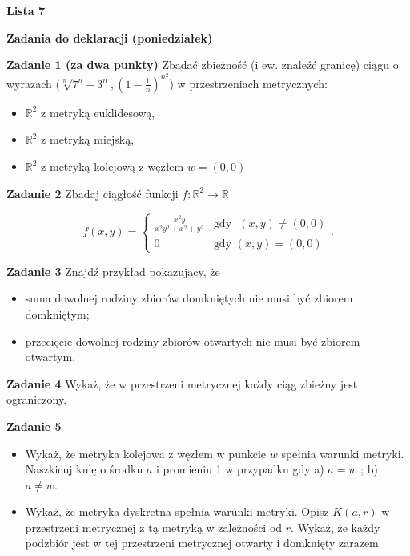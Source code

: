 \documentclass[a4paper,11pt]{article}
\begin{document}
\begin{center}
  {\large\textbf{Lista 7}}
\end{center}

\hrulefill
\begin{center}
    \textbf{Zadania do deklaracji (poniedziałek)}
\end{center}

\bigskip

\textbf{Zadanie 1 (za dwa punkty)} Zbadać zbieżność (i ew. znaleźć
granicę) ciągu o wyrazach $(\sqrt[n]{7^n-3^n}, (1-\tfrac{1}{n})^{n^2} $)
w przestrzeniach metrycznych:

\begin{itemize}
    \item $\mathbb{R}^2$ z metryką euklidesową,
    \item $\mathbb{R}^2$ z metryką miejską,
    \item $\mathbb{R}^2$ z metryką kolejową z węzłem  $w = (0,0)$
\end{itemize}

\bigskip

\textbf{Zadanie 2} Zbadaj ciągłość funkcji $f: \mathbb{R}^2 \to \mathbb{R}$

\[
f(x,y) = 
\begin{cases}
    \frac{x^2y}{x^2 y^2 + x^2 + y^2} & \text{gdy ~} (x,y) \neq (0,0)\\
    0 & \text{gdy~} (x,y) = (0,0)
\end{cases}
.\] 


\bigskip

\textbf{Zadanie 3} Znajdź przykład pokazujący, że 
\begin{itemize}
    \item  suma dowolnej rodziny zbiorów domkniętych nie musi być zbiorem
        domkniętym;
    \item przecięcie dowolnej rodziny zbiorów otwartych nie musi być
        zbiorem otwartym.
\end{itemize} 

\bigskip

\hrulefill

\bigskip

\textbf{Zadanie 4} Wykaż, że w przestrzeni metrycznej każdy ciąg zbieżny
jest ograniczony.

\bigskip

\textbf{Zadanie 5} 
\begin{itemize}
    \item Wykaż, że metryka kolejowa z węzłem w punkcie $w$ spełnia
        warunki metryki. Naszkicuj kulę o środku $a$ i promieniu 1 w
        przypadku gdy a) $a = w$ ; b) $a \neq w$.
    \item Wykaż, że metryka dyskretna spełnia warunki metryki. Opisz $K(a,
        r)$ w przestrzeni metrycznej z tą metryką w zależności od $r$.
        Wykaż, że każdy podzbiór jest w tej przestrzeni metrycznej
        otwarty i domknięty zarazem
\end{itemize}
\end{document}
